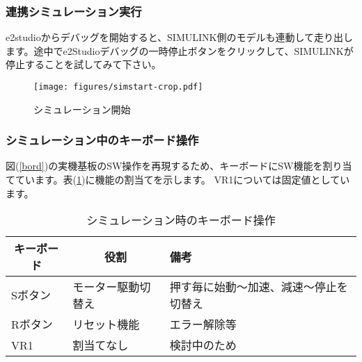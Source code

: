 \subsubsection{連携シミュレーション実行}
e2studioからデバッグを開始すると、SIMULINK側のモデルも連動して走り出します。途中でe2Studioデバッグの一時停止ボタンをクリックして、SIMULINKが停止することを試してみて下さい。
\begin{figure}[htbp!]
    \begin{center}
        \texttt{[image: figures/simstart-crop.pdf]}
    \end{center}
    \caption{シミュレーション開始}
    \label{simstart}
\end{figure}

\subsubsection{シミュレーション中のキーボード操作}
図(\ref{bord})の実機基板のSW操作を再現するため、キーボードにSW機能を割り当てています。表(\ref{keybord})に機能の割当てを示します。
VR1については固定値としています。
{\small
\begin{table}[htbp!]
\centering
\caption{シミュレーション時のキーボード操作}
\label{keybord}
\begin{tabular}{|l|l|l|}
\hline
\multicolumn{1}{|c|}{キーボード} & \multicolumn{1}{c|}{役割} & 備考                  \\ \hline
Sボタン                        & モーター駆動切替え               & 押す毎に始動～加速、減速～停止を切替え \\ \hline
Rボタン                        & リセット機能                  & エラー解除等              \\ \hline
VR1                      & 割当てなし                   & 検討中のため              \\ \hline
\end{tabular}
\end{table}
}

\newpage
